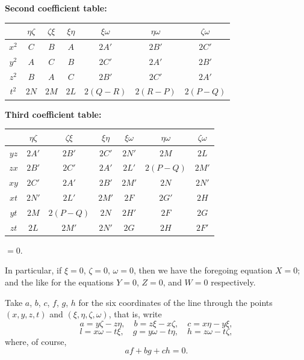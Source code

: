 \documentclass[11pt,a4paper]{book}
\begin{document}
\begin{center}
\textbf{Second coefficient table:}
\end{center}
\begin{center}
\begin{tabular}{c|cccccc}
& $\eta\zeta$ & $\zeta\xi$ & $\xi\eta$ & $\xi\omega$ & $\eta\omega$ & $\zeta\omega$ \\
\hline
$x^2$ & $C$ & $B$ & $A$ & $2A'$ & $2B'$ & $2C'$ \\
$y^2$ & $A$ & $C$ & $B$ & $2C'$ & $2A'$ & $2B'$ \\
$z^2$ & $B$ & $A$ & $C$ & $2B'$ & $2C'$ & $2A'$ \\
$t^2$ & $2N$ & $2M$ & $2L$ & $2(Q-R)$ & $2(R-P)$ & $2(P-Q)$
\end{tabular}
\end{center}

\begin{center}
\textbf{Third coefficient table:}
\end{center}
\begin{center}
\begin{tabular}{c|cccccc}
& $\eta\zeta$ & $\zeta\xi$ & $\xi\eta$ & $\xi\omega$ & $\eta\omega$ & $\zeta\omega$ \\
\hline
$yz$ & $2A'$ & $2B'$ & $2C'$ & $2N'$ & $2M$ & $2L$ \\
$zx$ & $2B'$ & $2C'$ & $2A'$ & $2L'$ & $2(P-Q)$ & $2M'$ \\
$xy$ & $2C'$ & $2A'$ & $2B'$ & $2M'$ & $2N$ & $2N'$ \\
$xt$ & $2N'$ & $2L'$ & $2M'$ & $2F$ & $2G'$ & $2H$ \\
$yt$ & $2M$ & $2(P-Q)$ & $2N$ & $2H'$ & $2F$ & $2G$ \\
$zt$ & $2L$ & $2M'$ & $2N'$ & $2G$ & $2H$ & $2F'$
\end{tabular}
\end{center}

\vspace{0.5em}
\begin{center}
$=0$.
\end{center}

In particular, if $\xi=0$, $\zeta=0$, $\omega=0$, then we have the foregoing equation
$X=0$; and the like for the equations $Y=0$, $Z=0$, and $W=0$ respectively.

Take $a$, $b$, $c$, $f$, $g$, $h$ for the six coordinates of the line through
the points $(x,y,z,t)$ and $(\xi,\eta,\zeta,\omega)$, that is, write
\[
a = y\zeta - z\eta,\quad
b = z\xi - x\zeta,\quad
c = x\eta - y\xi,
\]
\[
l = x\omega - t\xi,\quad
g = y\omega - t\eta,\quad
h = z\omega - t\zeta,
\]
where, of course,
\[
af+bg+ch = 0.
\]
\end{document}
